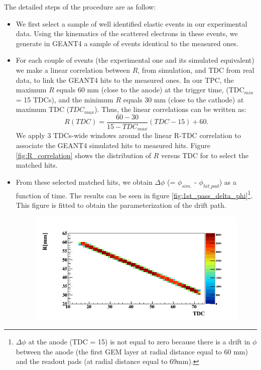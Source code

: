 The detailed steps of the procedure are as follow:
\begin{itemize}
\item We first select a sample of well identified elastic events in our 
   experimental data. Using the
   kinematics of the scattered electrons in these events, we generate in GEANT4
   a sample of events identical to the measured ones. 
\item  For each couple of events (the experimental one and its simulated equivalent)
   we make a linear correlation between $R$, from simulation, and TDC from 
   real data, to link the GEANT4 hits to the measured ones. In our TPC, the 
   maximum $R$ equals 60 mm (close to the anode) at the trigger time, 
   (TDC$_{min}$ = 15 TDCs), and the minimum $R$ equals 30 mm (close to the 
   cathode) at maximum TDC ($TDC_{max}$). Thus, the linear correlations can be 
   written as:
\begin{equation}
   R(TDC) = \frac{60-30}{15-TDC_{max}} (TDC-15) + 60.
\label{equ:R_TDC}
\end{equation}
We apply 3 TDCs-wide windows around the linear R-TDC correlation to associate 
the GEANT4 simulated hits to measured hits. Figure \ref{fig:R_correlation} 
shows the distribution of $R$ versus TDC for to select the matched hits.
\item From these selected matched hits, we obtain $\Delta \phi$ (= 
   $\phi_{sim.}$ - $\phi_{hit\_pad}$) as a function of time. The results can be seen in 
   figure \ref{fig:1st_pass_delta_phi}\footnote{$\Delta \phi$ at the anode (TDC = 15) 
   is not equal to zero because there is a drift in $\phi$ between the anode 
   (the first GEM layer at radial distance equal to 60 mm) and the readout pads 
   (at radial distance equal to 69mm).}. This figure is fitted to obtain the 
   parameterization of the drift path.
\begin{figure}[tpb]
\centering
\includegraphics[scale=0.45]{fig_rtpc/updates/TdcR_check_p1_10.png}

\end{figure}
\end{itemize}

